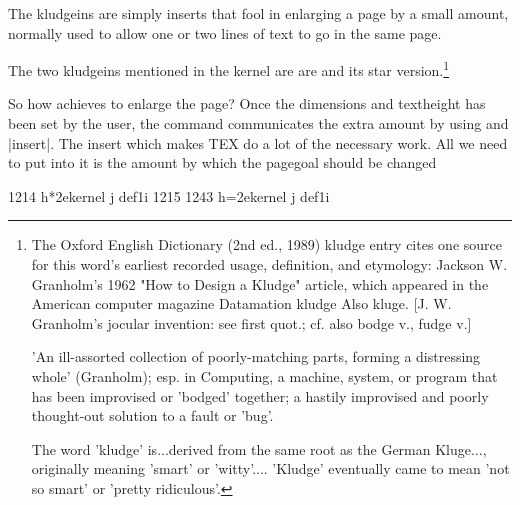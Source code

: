 \begin{multicols}{2}
The kludgeins are simply inserts that fool \tex in enlarging a page by a small amount, normally used to allow one or two lines of text to go in the same page.

The two kludgeins mentioned in the kernel are are  and its star version.\footnote{The Oxford English Dictionary (2nd ed., 1989) kludge entry cites one source for this word's earliest recorded usage, definition, and etymology: Jackson W. Granholm's 1962 "How to Design a Kludge" article, which appeared in the American computer magazine Datamation
kludge  Also kluge. [J. W. Granholm's jocular invention: see first quot.; cf. also bodge v., fudge v.]

'An ill-assorted collection of poorly-matching parts, forming a distressing whole' (Granholm); esp. in Computing, a machine, system, or program that has been improvised or 'bodged' together; a hastily improvised and poorly thought-out solution to a fault or 'bug'.

The word 'kludge' is...derived from the same root as the German Kluge..., originally meaning 'smart' or 'witty'.... 'Kludge' eventually came to mean 'not so smart' or 'pretty ridiculous'.} 

So how \latex achieves to enlarge the page? Once the dimensions and textheight has been set by the user, the command communicates the extra amount by using and |insert|. The insert which makes TEX do a lot of the necessary work. All we need to put
into it is the amount by which the pagegoal should be changed


\begin{Code}
\gdef \enlargethispage{%
1198 \@ifstar
1199 {%
1203   \@enlargepage{\hbox{\kern\p@}}}%
1204 {%
1208   \@enlargepage\@empty}%
1209 }
1214 h*2ekernel j def1i
1215 \gdef\@enlargepage#1#2{%
1216 h*tracei
1217 \tr@ce{\@spaces\@spaces by #2}%
1218 h=tracei
1219 \@tempskipa#2\relax
1220 \ifdim \@tempskipa>.5\maxdimen
1221 \@latexerr{Suggested\space extra\space height\space
1222 (\the\@tempskipa)\space dangerously\space
1223 large}\@eha
1224 \else
1225 \ifdim \vsize<.5\maxdimen
1226 h*tracei
1227 \tr@ce {Kludgeins added--pagegoal before: \the\pagegoal}%
1228 h=tracei
1229 \@bsphack
1230 \insert\@kludgeins{#1\vskip-\@tempskipa}%
1231 \@esphack
This next bit is for tracing only:
1232 h*tracei
1233 \ifvmode \par
1234 \tr@ce {Kludgeins added--pagegoal after: \the \pagegoal}%
1235 \fi
1236 h=tracei
1237 \else
1238 \@latexerr{Page\space height\space already\space
1239 too\space large}\@eha
1240 \fi
1241 \fi
1242 }
1243 h=2ekernel j def1i
\end{Code}


\end{multicols}
